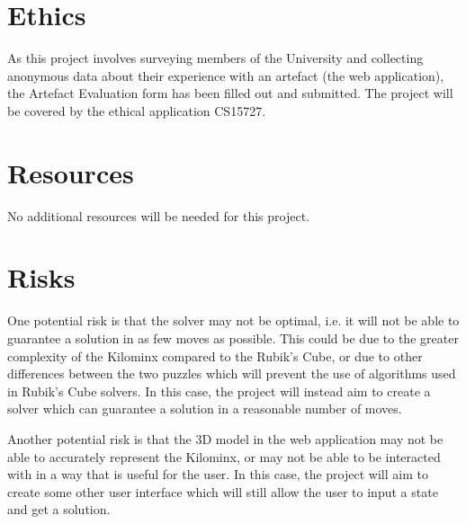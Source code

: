 \documentclass[12pt]{article}
\begin{document}
\section{Ethics}
As this project involves surveying members of the University and collecting anonymous data about their experience with an artefact (the web application), the Artefact Evaluation form has been filled out and submitted. The project will be covered by the ethical application CS15727.

\section{Resources}
No additional resources will be needed for this project.

\section{Risks}
One potential risk is that the solver may not be optimal, i.e. it will not be able to guarantee a solution in as few moves as possible. This could be due to the greater complexity of the Kilominx compared to the Rubik's Cube, or due to other differences between the two puzzles which will prevent the use of algorithms used in Rubik's Cube solvers. In this case, the project will instead aim to create a solver which can guarantee a solution in a reasonable number of moves.

Another potential risk is that the 3D model in the web application may not be able to accurately represent the Kilominx, or may not be able to be interacted with in a way that is useful for the user. In this case, the project will aim to create some other user interface which will still allow the user to input a state and get a solution.

\printbibliography
\end{document}
